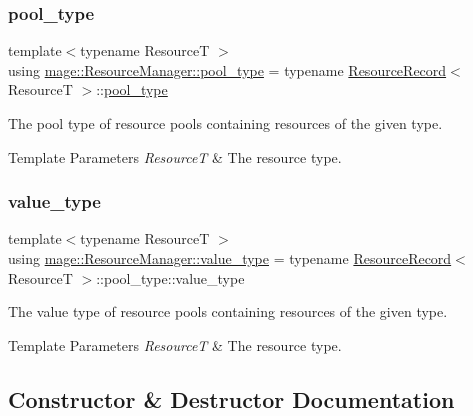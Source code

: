 \subsubsection{\texorpdfstring{pool\+\_\+type}{pool\_type}}
{\footnotesize\ttfamily template$<$typename ResourceT $>$ \\
using \hyperlink{classmage_1_1_resource_manager_a4416f0a710790d8aa2d0bc006764695a}{mage\+::\+Resource\+Manager\+::pool\+\_\+type} =  typename \hyperlink{structmage_1_1_resource_manager_1_1_resource_record}{Resource\+Record}$<$ ResourceT $>$\+::\hyperlink{classmage_1_1_resource_manager_a4416f0a710790d8aa2d0bc006764695a}{pool\+\_\+type}}

The pool type of resource pools containing resources of the given type.


\begin{DoxyTemplParams}{Template Parameters}
{\em ResourceT} & The resource type. \\
\hline
\end{DoxyTemplParams}
\hypertarget{classmage_1_1_resource_manager_aaa3a9fe40c809cd51eda14d2322746ac}{}\label{classmage_1_1_resource_manager_aaa3a9fe40c809cd51eda14d2322746ac} 
\subsubsection{\texorpdfstring{value\+\_\+type}{value\_type}}
{\footnotesize\ttfamily template$<$typename ResourceT $>$ \\
using \hyperlink{classmage_1_1_resource_manager_aaa3a9fe40c809cd51eda14d2322746ac}{mage\+::\+Resource\+Manager\+::value\+\_\+type} =  typename \hyperlink{structmage_1_1_resource_manager_1_1_resource_record}{Resource\+Record}$<$ ResourceT $>$\+::pool\+\_\+type\+::value\+\_\+type}

The value type of resource pools containing resources of the given type.


\begin{DoxyTemplParams}{Template Parameters}
{\em ResourceT} & The resource type. \\
\hline
\end{DoxyTemplParams}


\subsection{Constructor \& Destructor Documentation}
\hypertarget{classmage_1_1_resource_manager_a0ff509899a9fbef2096c60b3d3d80bd5}{}\label{classmage_1_1_resource_manager_a0ff509899a9fbef2096c60b3d3d80bd5} 
